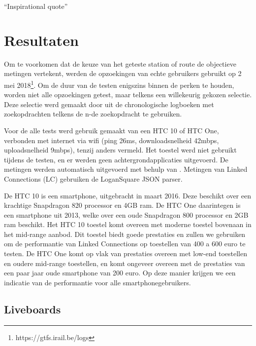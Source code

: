 \begin{savequote}[0.55\linewidth]
	``Inspirational quote''
\end{savequote}

\chapter{Resultaten}
\label{chap:resultaten}

Om te voorkomen dat de keuze van het geteste station of route de objectieve metingen vertekent, werden de opzoekingen van echte gebruikers gebruikt op 2 mei 2018\footnote{https://gtfs.irail.be/logs}. Om de duur van de testen enigszins binnen de perken te houden, worden niet alle opzoekingen getest, maar telkens een willekeurig gekozen selectie. Deze selectie werd gemaakt door uit de chronologische logboeken met zoekopdrachten telkens de n-de zoekopdracht te gebruiken.

Voor de alle tests werd gebruik gemaakt van een HTC 10 of HTC One, verbonden met internet via wifi (ping 26ms, downloadsnelheid 42mbps, uploadsnelheid 9mbps), tenzij anders vermeld. Het toestel werd niet gebruikt tijdens de testen, en er werden geen achtergrondapplicaties uitgevoerd. De metingen werden automatisch uitgevoerd met behulp van . Metingen van Linked Connections (LC) gebruiken de LoganSquare JSON parser.

De HTC 10 is een  smartphone, uitgebracht in maart 2016. Deze beschikt over een krachtige Snapdragon 820 processor en 4GB ram. De HTC One daarintegen is een  smartphone uit 2013, welke over een oude Snapdragon 800 processor en 2GB ram beschikt. Het HTC 10 toestel komt overeen met moderne toestel bovenaan in het mid-range aanbod. Dit toestel biedt goede prestaties en zullen we gebruiken om de performantie van Linked Connections op toestellen van 400 a 600 euro te testen. De HTC One komt op vlak van prestaties overeen met low-end toestellen en oudere mid-range toestellen, en komt ongeveer overeen met de prestaties van een paar jaar oude smartphone van 200 euro. Op deze manier krijgen we een indicatie van de performantie voor alle smartphonegebruikers.


\section{Liveboards}
